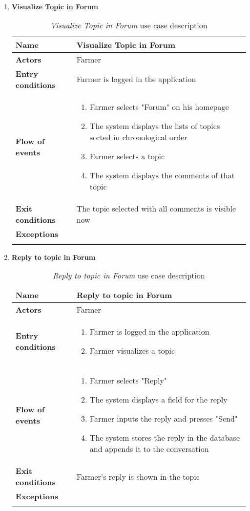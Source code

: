 \begin{enumerate}
			\item \textbf{Visualize Topic in Forum}
				\begin{longtable}{p{0.26\linewidth}p{0.75\linewidth}}
					\toprule
					\textbf{Name} & \textbf{Visualize Topic in Forum} \\
					\midrule
					\textbf{Actors} & Farmer\\
					\midrule
					\textbf{Entry conditions} & Farmer is logged in the application \\
					\midrule
					\textbf{Flow of events} & 
					\begin{enumerate}
						\item Farmer selects "Forum" on his homepage
						\item The system displays the lists of topics sorted in chronological order
						\item Farmer selects a topic
						\item The system displays the comments of that topic
					\end{enumerate} \\
					\midrule
					\textbf{Exit conditions} & The topic selected with all comments is visible now\\
					\midrule
					\textbf{Exceptions} &  \\
					\bottomrule
					\caption{\emph{Visualize Topic in Forum} use case description}
				\end{longtable}
			
			\item \textbf{Reply to topic in Forum}
				\begin{longtable}{p{0.26\linewidth}p{0.75\linewidth}}
					\toprule
					\textbf{Name} & \textbf{Reply to topic in Forum} \\
					\midrule
					\textbf{Actors} & Farmer\\
					\midrule
					\textbf{Entry conditions} & \begin{enumerate}
													\item Farmer is logged in the application
													\item Farmer visualizes a topic
												\end{enumerate} \\
					\midrule
					\textbf{Flow of events} & 
					\begin{enumerate}
						\item Farmer selects "Reply"
						\item The system displays a field for the reply
						\item Farmer inputs the reply and presses "Send"
						\item The system stores the reply in the database and appends it to the conversation
					\end{enumerate} \\
					\midrule
					\textbf{Exit conditions} & Farmer's reply is shown in the topic \\
					\midrule
					\textbf{Exceptions} &  \\
					\bottomrule
					\caption{\emph{Reply to topic in Forum} use case description}
				\end{longtable}
		

\end{enumerate}
